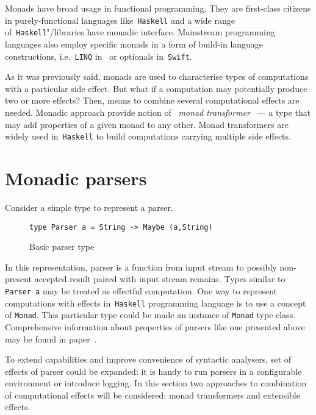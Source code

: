     Monads have broad usage in functional programming. They are first-class citizens
    in purely-functional languages like~\texttt{Haskell} and a wide range of~\texttt{Haskell}"/libraries have monadic interface. Mainstream programming languages also
    employ specific monads in a form of build-in language constructions,
    i.e.~\texttt{LINQ} in~\texttt{\cs} or optionals in~\texttt{Swift}.

    As it was previously said, monads are used to characterise types of computations with a particular side effect. But what if a computation may
    potentially produce two or more effects? Then, means to combine several
    computational effects are needed. Monadic approach provide notion of
    ~\emph{monad transformer}~\cite{Liang:1995:MTM:199448.199528} --- a type that
    may add properties of a given monad to any other. Monad transformers are widely
    used in~\texttt{Haskell} to build computations carrying multiple side effects.

  \section{Monadic parsers}
  \label{cpt-parsers:monadic}

    Consider a simple type to represent a parser.

    \begin{figure}[h]
    \begin{lstlisting}
type Parser a = String -> Maybe (a,String)
    \end{lstlisting}
    \caption{Basic parser type}
    \label{listing:maybeParser}
    \end{figure}

    In this representation, parser is a
    function from input stream to possibly non-present accepted result paired
    with input stream remains.
    Types similar to \texttt{Parser a} may be treated as effectful computation.
    One way to represent computations with effects in~\texttt{Haskell}
    programming language is to use a concept of \texttt{Monad}. This particular
    type could be made an instance of \texttt{Monad} type class.
    Comprehensive information about properties of parsers like one presented
    above may be found in paper~\cite{monParsing}.

    To extend capabilities and improve convenience of syntactic analysers, set of
    effects of parser could be expanded: it is handy to run parsers in a configurable
    environment or introduce logging. In this section two approaches to combination
    of computational effects will be considered: monad transformers and extensible
    effects.

